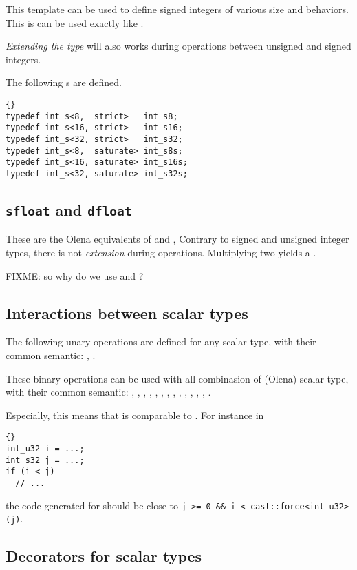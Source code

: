This template can be used to define signed integers of various size
and behaviors.  This is can be used exactly like
.

\emph{Extending the type} will also works during operations between
unsigned and signed integers.

The following s are defined.
\begin{lstlisting}{}
typedef int_s<8,  strict>	int_s8;
typedef int_s<16, strict>	int_s16;
typedef int_s<32, strict>	int_s32;
typedef int_s<8,  saturate>	int_s8s;
typedef int_s<16, saturate>	int_s16s;
typedef int_s<32, saturate>	int_s32s;
\end{lstlisting}

\subsection{\lstinline$sfloat$ and \lstinline$dfloat$}

These are the Olena equivalents of  and ,
Contrary to signed and unsigned integer types, there is not
\emph{extension} during operations.  Multiplying two 
yields a .

FIXME: so why do we use  and ?

\subsection{Interactions between scalar types}

The following unary operations are defined for any scalar type, with
their common semantic:
, .

These binary operations can be used with all combinasion of (Olena)
scalar type, with their common semantic: , ,
, , , , ,
, , , , , , .

Especially, this means that  is comparable to
.  For instance in
\begin{lstlisting}{}
int_u32 i = ...;
int_s32 j = ...;
if (i < j)
  // ...
\end{lstlisting}
the code generated for  should be close to
\lstinline$j >= 0 && i < cast::force<int_u32>(j)$.

\subsection{Decorators for scalar types}

